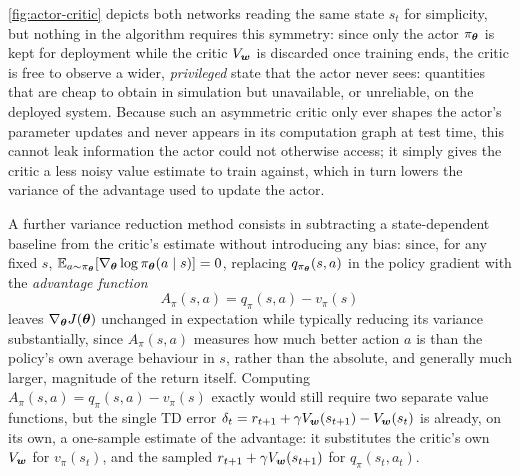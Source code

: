 \autoref{fig:actor-critic} depicts both networks reading the same state $s_t$ for simplicity, but nothing in the algorithm requires this symmetry: since only the actor $\pi_{\bm{\theta}}$ is kept for deployment while the critic $V_{\bm{w}}$ is discarded once training ends, the critic is free to observe a wider, \emph{privileged} state that the actor never sees: quantities that are cheap to obtain in simulation but unavailable, or unreliable, on the deployed system. Because such an asymmetric critic only ever shapes the actor's parameter updates and never appears in its computation graph at test time, this cannot leak information the actor could not otherwise access; it simply gives the critic a less noisy value estimate to train against, which in turn lowers the variance of the advantage used to update the actor.

\vspace{1mm}
A further variance reduction method consists in subtracting a state-dependent baseline from the critic's estimate without introducing any bias: since, for any fixed $s$, $\mathbb{E}_{a\sim\pi_{\bm{\theta}}}[\nabla_{\bm{\theta}} \log \pi_{\bm{\theta}}(a\mid s)] = 0$, replacing $q_{\pi_{\bm{\theta}}}(s,a)$ in the policy gradient with the \emph{advantage function}
\begin{equation}
A_\pi(s,a) = q_\pi(s,a) - v_\pi(s)
\end{equation}
leaves $\nabla_{\bm{\theta}} J(\bm{\theta})$ unchanged in expectation while typically reducing its variance substantially, since $A_\pi(s,a)$ measures how much better action $a$ is than the policy's own average behaviour in $s$, rather than the absolute, and generally much larger, magnitude of the return itself. Computing $A_\pi(s,a) = q_\pi(s,a) - v_\pi(s)$ exactly would still require two separate value functions, but the single TD error $\delta_t = r_{t+1} + \gamma V_{\bm{w}}(s_{t+1}) - V_{\bm{w}}(s_t)$ is already, on its own, a one-sample estimate of the advantage: it substitutes the critic's own $V_{\bm{w}}$ for $v_\pi(s_t)$, and the sampled $r_{t+1} + \gamma V_{\bm{w}}(s_{t+1})$ for $q_\pi(s_t,a_t)$. 


